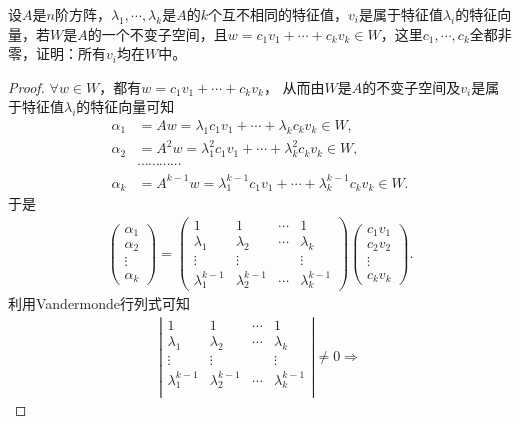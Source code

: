 \documentclass[../../main.tex]{subfiles}
\begin{document}
\begin{example}
设$A$是$n$阶方阵，$\lambda_1,\cdots,\lambda_k$是$A$的$k$个互不相同的特征值，$v_i$是属于特征值$\lambda_i$的特征向量，若$W$是$A$的一个不变子空间，且$w = c_1v_1 + \cdots + c_kv_k\in W$，这里$c_1,\cdots,c_k$全都非零，证明：所有$v_i$均在$W$中。 
\end{example}
\begin{proof}
$\forall w\in W$，都有$w = c_1v_1 + \cdots + c_kv_k$，
从而由$W$是$A$的不变子空间及$v_i$是属于特征值$\lambda_i$的特征向量可知
\begin{align*}
\alpha_1 &= Aw = \lambda_1c_1v_1 + \cdots + \lambda_kc_kv_k\in W, \\
\alpha_2 &= A^2w = \lambda_1^2c_1v_1 + \cdots + \lambda_k^2c_kv_k\in W, \\
&\cdots \cdots \cdots \cdots \\
\alpha_k &= A^{k - 1}w = \lambda_1^{k - 1}c_1v_1 + \cdots + \lambda_k^{k - 1}c_kv_k\in W.
\end{align*}
于是
\begin{align*}
\begin{pmatrix}
\alpha_1 \\
\alpha_2 \\
\vdots \\
\alpha_k
\end{pmatrix} = 
\begin{pmatrix}
1 & 1 & \cdots & 1 \\
\lambda_1 & \lambda_2 & \cdots & \lambda_k \\
\vdots & \vdots & & \vdots \\
\lambda_1^{k - 1} & \lambda_2^{k - 1} & \cdots & \lambda_k^{k - 1}
\end{pmatrix}
\begin{pmatrix}
c_1v_1 \\
c_2v_2 \\
\vdots \\
c_kv_k
\end{pmatrix}.
\end{align*}
利用Vandermonde行列式可知
\begin{align*}
\left| \begin{matrix}
1&		1&		\cdots&		1\\
\lambda _1&		\lambda _2&		\cdots&		\lambda _k\\
\vdots&		\vdots&		&		\vdots\\
\lambda _{1}^{k-1}&		\lambda _{2}^{k-1}&		\cdots&		\lambda _{k}^{k-1}\\
\end{matrix} \right|\ne 0\Rightarrow 

\end{align*}
\end{proof}
\end{document}
